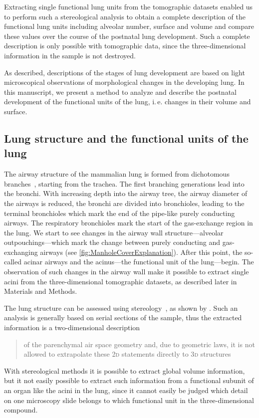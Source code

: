 \documentclass[%
	paper=a4,%
	abstract=true,%
	]{scrartcl}
\newcommand{\ie}{i.\,e.\xspace}
\newcommand{\twod}{2\textsc{d}\xspace}
\newcommand{\threed}{3\textsc{d}\xspace}
\begin{document}
Extracting single functional lung units from the tomographic datasets enabled us to perform such a stereological analysis to obtain a complete description of the functional lung units including alveolar number, surface and volume and compare these values over the course of the postnatal lung development. Such a complete description is only possible with tomographic data, since the three-dimensional information in the sample is not destroyed.

As \citet{Schittny2007a} described, descriptions of the stages of lung development are based on light microscopical observations of morphological changes in the developing lung. In this manuscript, we present a method to analyze and describe the postnatal development of the functional units of the lung, \ie changes in their volume and surface.

\subsection{Lung structure and the functional units of the lung}
The airway structure of the mammalian lung is formed from dichotomous branches~\cite{Weibel1991}, starting from the trachea. The first branching generations lead into the bronchi. With increasing depth into the airway tree, the airway diameter of the airways is reduced, the bronchi are divided into bronchioles, leading to the terminal bronchioles which mark the end of the pipe-like purely conducting airways. The respiratory bronchioles mark the start of the gas-exchange region in the lung. We start to see changes in the airway wall structure---alveolar outpouchings---which mark the change between purely conducting and gas-exchanging airways (see \autoref{fig:ManholeCoverExplanation}). After this point, the so-called acinar airways and the acinus---the functional unit of the lung---begin. The observation of such changes in the airway wall make it possible to extract single acini from the three-dimensional tomographic datasets, as described later in Materials and Methods.

The lung structure can be assessed using stereology~\cite{Hsia2010}, as shown by \citet{Tschanz2002}. Such an analysis is generally based on serial sections of the sample, thus the extracted information is a two-dimensional description \blockquote[\cite{Tschanz2002}]{of the parenchymal air space geometry and, due to geometric laws, it is not allowed to extrapolate these \twod statements directly to \threed structures}. With stereological methods it is possible to extract global volume information, but it not easily possible to extract such information from a functional subunit of an organ like the acini in the lung, since it cannot easily be judged which detail on one microscopy slide belongs to which functional unit in the three-dimensional compound.
\end{document}
